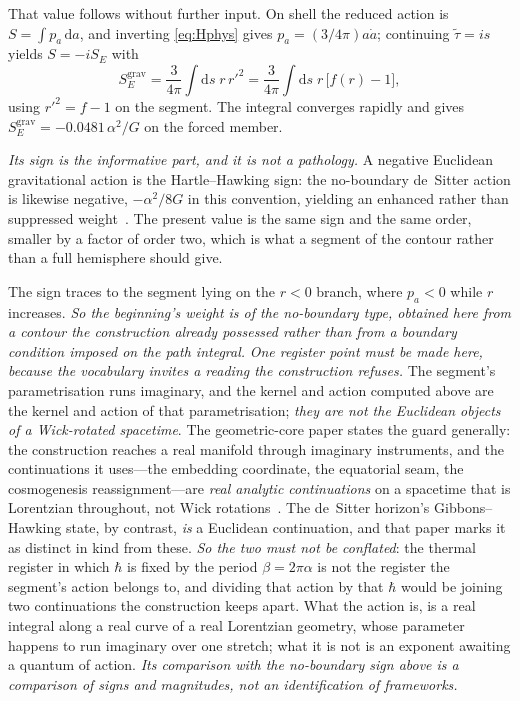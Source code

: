 \documentclass[11pt,a4paper]{article}
\theoremstyle{plain}
\theoremstyle{definition}
\theoremstyle{remark}
\newcommand{\dd}{\mathrm{d}}   %
\begin{document}
That value follows without further input. On shell the reduced action is $S=\int p_{a}\,\dd a$, and inverting
\eqref{eq:Hphys} gives $p_{a}=(3/4\pi)a\dot a$; continuing $\tilde\tau=is$ yields $S=-iS_{E}$ with
\begin{equation}
S_{E}^{\mathrm{grav}}=\frac{3}{4\pi}\int\dd s\;r\,r'^{2}
=\frac{3}{4\pi}\int\dd s\;r\,\bigl[f(r)-1\bigr],
\label{eq:grav-action}
\end{equation}
using $r'^{2}=f-1$ on the segment. The integral converges rapidly and gives
$S_{E}^{\mathrm{grav}}=-0.0481\,\alpha^{2}/G$ on the forced member.



\emph{Its sign is the informative part, and it is not a pathology.} A negative Euclidean gravitational action is
the Hartle--Hawking sign: the no-boundary de~Sitter action is likewise negative, $-\alpha^{2}/8G$ in this
convention, yielding an enhanced rather than suppressed weight~\cite{HartleHawking1983}. The present value is
the same sign and the same order, smaller by a factor of order two, which is what a segment of the contour
rather than a full hemisphere should give. 

The sign traces to the segment lying on the $r<0$ branch, where
$p_{a}<0$ while $r$ increases. \emph{So the beginning's weight is of the no-boundary type, obtained here from a
contour the construction already possessed rather than from a boundary condition imposed on the path integral.} \emph{One register point must be made here, because the vocabulary invites a reading the construction
refuses.} The segment's parametrisation runs imaginary, and the kernel and action computed above are the
kernel and action of that parametrisation; \emph{they are not the Euclidean objects of a Wick-rotated
spacetime}. The geometric-core paper states the guard generally: the construction reaches a real manifold
through imaginary instruments, and the continuations it uses---the embedding coordinate, the equatorial seam,
the cosmogenesis reassignment---are \emph{real analytic continuations} on a spacetime that is Lorentzian
throughout, not Wick rotations~\cite{JanzenGeometricCore}. The de~Sitter horizon's Gibbons--Hawking state, by
contrast, \emph{is} a Euclidean continuation, and that paper marks it as distinct in kind from these. \emph{So
the two must not be conflated}: the thermal register in which $\hbar$ is fixed by the period
$\beta=2\pi\alpha$ is not the register the segment's action belongs to, and dividing that action by that
$\hbar$ would be joining two continuations the construction keeps apart. What the action is, is a real integral
along a real curve of a real Lorentzian geometry, whose parameter happens to run imaginary over one stretch;
what it is not is an exponent awaiting a quantum of action. \emph{Its comparison with the no-boundary sign
above is a comparison of signs and magnitudes, not an identification of frameworks.}
\end{document}
